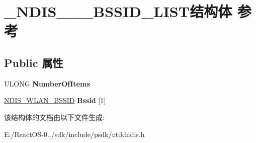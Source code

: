 \hypertarget{struct___n_d_i_s__802__11___b_s_s_i_d___l_i_s_t}{}\section{\+\_\+\+N\+D\+I\+S\+\_\+\_\+\_\+\+B\+S\+S\+I\+D\+\_\+\+L\+I\+S\+T结构体 参考}
\label{struct___n_d_i_s__802__11___b_s_s_i_d___l_i_s_t}
\subsection*{Public 属性}
\begin{DoxyCompactItemize}
\item 
\mbox{\label{struct___n_d_i_s__802__11___b_s_s_i_d___l_i_s_t_ac6dd279783af983adec7b4a7da20f9d0}} 
U\+L\+O\+NG {\bfseries Number\+Of\+Items}
\item 
\mbox{\label{struct___n_d_i_s__802__11___b_s_s_i_d___l_i_s_t_a494055d4c6dbc4fe1f895b1d506c74cb}} 
\hyperlink{struct___n_d_i_s___w_l_a_n___b_s_s_i_d}{N\+D\+I\+S\+\_\+\+W\+L\+A\+N\+\_\+\+B\+S\+S\+ID} {\bfseries Bssid} \mbox{[}1\mbox{]}
\end{DoxyCompactItemize}


该结构体的文档由以下文件生成\+:\begin{DoxyCompactItemize}
\item 
E\+:/\+React\+O\+S-\/0../sdk/include/psdk/ntddndis.\+h\end{DoxyCompactItemize}
